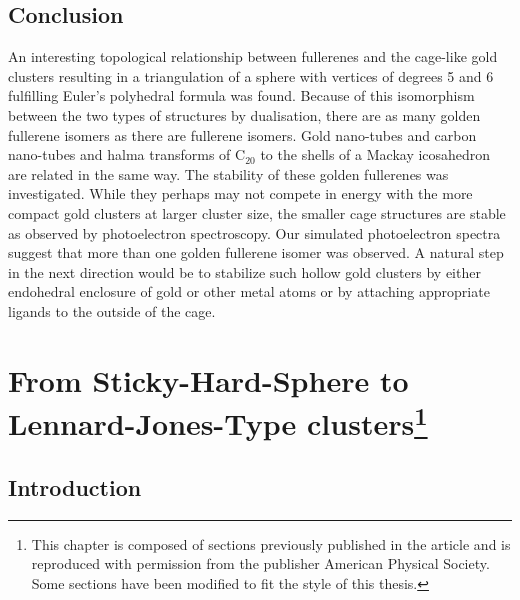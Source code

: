 \section{Conclusion}

An interesting topological relationship between fullerenes and the cage-like
gold clusters resulting in a triangulation of a sphere with vertices of degrees
5 and 6 fulfilling Euler's polyhedral formula was found. Because of this
isomorphism between the two types of structures by dualisation, there are as
many golden fullerene isomers as there are fullerene isomers. Gold nano-tubes and
carbon nano-tubes and halma transforms of C$_{20}$ to the shells of a Mackay
icosahedron are related in the same way. The stability of these golden
fullerenes was investigated. While they perhaps may not compete in energy with
the more compact gold clusters at larger cluster size, the smaller cage
structures are stable as observed by photoelectron spectroscopy. Our simulated
photoelectron spectra suggest that more than one golden fullerene isomer was
observed. A natural step in the next direction would be to stabilize such hollow
gold clusters by either endohedral enclosure of gold or other metal atoms or by
attaching appropriate ligands to the outside of the cage.




\chapter[From Sticky-Hard-Sphere to Lennard-Jones-Type Clusters]{From
    Sticky-Hard-Sphere to Lennard-Jones-Type clusters\footnote{This chapter is
    composed of sections previously published in the article
    \autocite{Trombach_stickyhardsphereLennardJonestypeclusters_2018}
    and is reproduced with permission from the publisher 
    American Physical Society. Some sections have been modified to fit the style
    of this thesis.}}
\label{sec:fromstickyhardspheretoLJtypeclusters}

\section{Introduction}

